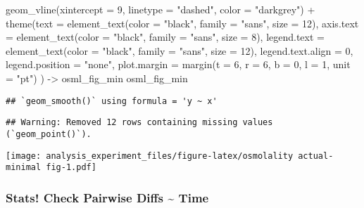 \documentclass[
]{article}
\newenvironment{Shaded}{\begin{snugshade}}{\end{snugshade}}
\newcommand{\AttributeTok}[1]{\textcolor[rgb]{0.77,0.63,0.00}{#1}}
\newcommand{\DecValTok}[1]{\textcolor[rgb]{0.00,0.00,0.81}{#1}}
\newcommand{\FunctionTok}[1]{\textcolor[rgb]{0.00,0.00,0.00}{#1}}
\newcommand{\NormalTok}[1]{#1}
\newcommand{\OtherTok}[1]{\textcolor[rgb]{0.56,0.35,0.01}{#1}}
\newcommand{\SpecialCharTok}[1]{\textcolor[rgb]{0.00,0.00,0.00}{#1}}
\newcommand{\StringTok}[1]{\textcolor[rgb]{0.31,0.60,0.02}{#1}}
\begin{document}
\begin{Shaded}
\begin{Highlighting}[]
  \FunctionTok{geom\_vline}\NormalTok{(}\AttributeTok{xintercept =} \DecValTok{9}\NormalTok{,}
             \AttributeTok{linetype =} \StringTok{"dashed"}\NormalTok{,}
             \AttributeTok{color =} \StringTok{"darkgrey"}\NormalTok{) }\SpecialCharTok{+}
  \FunctionTok{theme}\NormalTok{(}\AttributeTok{text =} \FunctionTok{element\_text}\NormalTok{(}\AttributeTok{color =} \StringTok{"black"}\NormalTok{, }
                            \AttributeTok{family =} \StringTok{"sans"}\NormalTok{, }
                            \AttributeTok{size =} \DecValTok{12}\NormalTok{),}
        \AttributeTok{axis.text =} \FunctionTok{element\_text}\NormalTok{(}\AttributeTok{color =} \StringTok{"black"}\NormalTok{, }
                                 \AttributeTok{family =} \StringTok{"sans"}\NormalTok{, }
                                 \AttributeTok{size =} \DecValTok{8}\NormalTok{),}
        \AttributeTok{legend.text =} \FunctionTok{element\_text}\NormalTok{(}\AttributeTok{color =} \StringTok{"black"}\NormalTok{, }
                                 \AttributeTok{family =} \StringTok{"sans"}\NormalTok{, }
                                 \AttributeTok{size =} \DecValTok{12}\NormalTok{),}
        \AttributeTok{legend.text.align =} \DecValTok{0}\NormalTok{,}
        \AttributeTok{legend.position =} \StringTok{"none"}\NormalTok{,}
        \AttributeTok{plot.margin =} \FunctionTok{margin}\NormalTok{(}\AttributeTok{t =} \DecValTok{6}\NormalTok{, }\AttributeTok{r =} \DecValTok{6}\NormalTok{, }\AttributeTok{b =} \DecValTok{0}\NormalTok{, }\AttributeTok{l =} \DecValTok{1}\NormalTok{, }\AttributeTok{unit =} \StringTok{"pt"}\NormalTok{)}
\NormalTok{        ) }\OtherTok{{-}\textgreater{}}\NormalTok{ osml\_fig\_min}
\NormalTok{osml\_fig\_min}
\end{Highlighting}
\end{Shaded}

\begin{verbatim}
## `geom_smooth()` using formula = 'y ~ x'
\end{verbatim}

\begin{verbatim}
## Warning: Removed 12 rows containing missing values (`geom_point()`).
\end{verbatim}

\texttt{[image: analysis\_experiment\_files/figure-latex/osmolality actual-minimal fig-1.pdf]}

\hypertarget{stats-check-pairwise-diffs-time}{%
\subsubsection{Stats! Check Pairwise Diffs \textasciitilde{}
Time}\label{stats-check-pairwise-diffs-time}}
\end{document}
